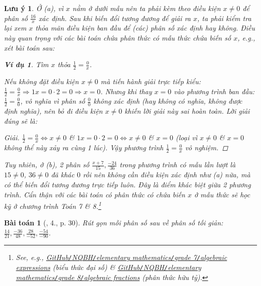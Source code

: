 \documentclass{article}
\newtheorem{baitoan}{Bài toán}
\newtheorem{luuy}{Lưu ý}
\newtheorem{vidu}{Ví dụ}
\begin{document}
\begin{luuy}
	Ở (a), vì $x$ nằm ở dưới mẫu nên ta phải kèm theo điều kiện $x\ne0$ để phân số $\frac{16}{x}$ xác định. Sau khi biến đổi tương đương để giải ra $x$, ta phải kiểm tra lại xem $x$ thỏa mãn điều kiện ban đầu để (các) phân số xác định hay không. Điều này quan trọng với các bài toán chứa phân thức có mẫu thức chứa biến số $x$, e.g., xét bài toán sau:
	
	\begin{vidu}
		Tìm $x$ thỏa $\frac{1}{2} = \frac{0}{x}$.
	\end{vidu}
	Nếu không đặt điều kiện $x\ne0$ mà tiến hành giải trực tiếp kiểu: $\frac{1}{2} = \frac{0}{x}\Rightarrow 1x = 0\cdot2 = 0\Rightarrow x = 0$. Nhưng khi thay $x = 0$ vào phương trình ban đầu: $\frac{1}{2} = \frac{0}{0}$, vô nghĩa vì phân số $\frac{0}{0}$ không xác định (hay không có nghĩa, không được định nghĩa), nên bỏ đi điều kiện $x\ne0$ khiến lời giải này sai hoàn toàn. Lời giải đúng sẽ là:
	
	\begin{proof}[Giải]
		$\frac{1}{2} = \frac{0}{x}\Leftrightarrow x\ne0$ \& $1x = 0\cdot2 = 0\Leftrightarrow x\ne0$ \& $x = 0$ (loại vì $x\ne 0$ \& $x = 0$ không thể này xảy ra cùng 1 lúc). Vậy phương trình $\frac{1}{2} = \frac{0}{x}$ vô nghiệm.
	\end{proof}
	Tuy nhiên, ở (b), 2 phân số $\frac{x + 7}{15},\frac{-24}{36}$ trong phương trình có mẫu lần lượt là $15\ne0$, $36\ne0$ đã khác $0$ rồi nên không cần điều kiện xác định như (a) nữa, mà có thể biến đổi tương đương trực tiếp luôn. Đây là điểm khác biệt giữa 2 phương trình. Cẩn thận với các bài toán có phân thức có chứa biến $x$ ở mẫu thức sẽ học kỹ ở chương trình Toán 7 \& 8.\footnote{See, e.g., \href{https://github.com/NQBH/hobby/blob/master/elementary_mathematics/grade_7/algebraic_expression/NQBH_algebraic_expression.pdf}{GitHub\texttt{/}NQBH\texttt{/}elementary mathematics\texttt{/}grade 7\texttt{/}algebraic expressions} (biểu thức đại số) \& \href{https://github.com/NQBH/hobby/blob/master/elementary_mathematics/grade_8/algebraic_rational_fractions/NQBH_algebraic_rational_fractions.pdf}{GitHub\texttt{/}NQBH\texttt{/}elementary mathematics\texttt{/}grade 8\texttt{/}algebraic fractions} (phân thức hữu tỷ).}
\end{luuy}

\begin{baitoan}[\cite{SGK_Toan_6_Canh_Dieu_tap_2}, 4., p. 30]
	Rút gọn mỗi phân số sau về phân số tối giản: $\frac{14}{21},\frac{-36}{48},\frac{28}{-52},\frac{-54}{-90}$.
\end{baitoan}
\end{document}
